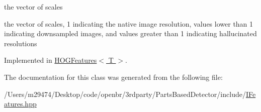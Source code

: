 the vector of scales 

the vector of scales, 1 indicating the native image resolution, values lower than 1 indicating downsampled images, and values greater than 1 indicating hallucinated resolutions 

Implemented in \hyperlink{class_h_o_g_features_ad9668fda860881c676e1d1bd70adc18c}{H\-O\-G\-Features$<$ T $>$}.



The documentation for this class was generated from the following file\-:\begin{DoxyCompactItemize}
\item 
/\-Users/m29474/\-Desktop/code/openbr/3rdparty/\-Parts\-Based\-Detector/include/\hyperlink{_i_features_8hpp}{I\-Features.\-hpp}\end{DoxyCompactItemize}
